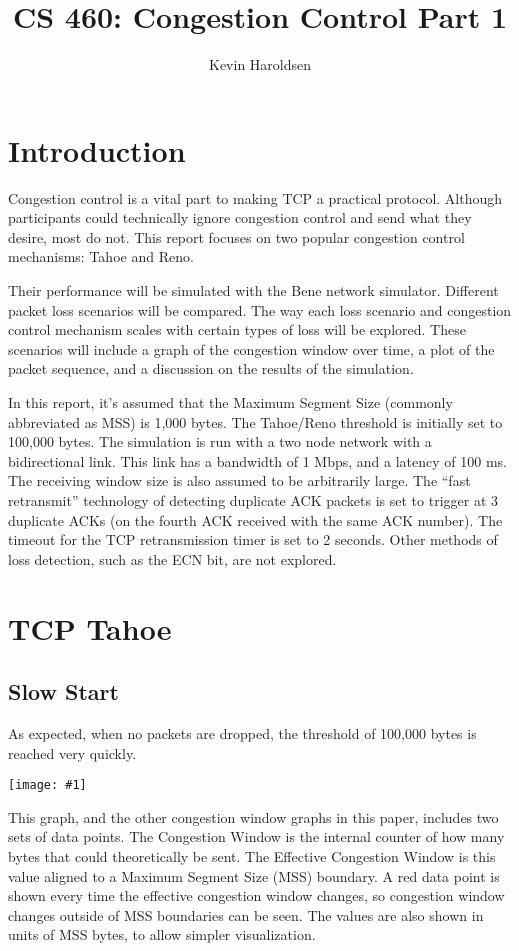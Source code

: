 \documentclass[fleqn,11pt]{article}
\title{CS 460: Congestion Control Part 1}
\author{Kevin Haroldsen}
\date{}
\newcommand{\graph}[2]{\begin{center}\texttt{[image: \#1]}\end{center}}
\newcommand{\cwnd}[1]{\graph{#1/cwnd}{height=3.5in}}
\begin{document}
\maketitle

\section{Introduction}
Congestion control is a vital part to making TCP a practical protocol.
Although participants could technically ignore congestion control and send what they desire, most do not.
This report focuses on two popular congestion control mechanisms: Tahoe and Reno.

Their performance will be simulated with the Bene network simulator.
Different packet loss scenarios will be compared.
The way each loss scenario and congestion control mechanism scales with certain types of loss will be explored.
These scenarios will include a graph of the congestion window over time, a plot of the packet sequence, and a discussion on the results of the simulation.

In this report, it's assumed that the Maximum Segment Size (commonly abbreviated as MSS) is 1,000 bytes.
The Tahoe/Reno threshold is initially set to 100,000 bytes.
The simulation is run with a two node network with a bidirectional link.
This link has a bandwidth of 1 Mbps, and a latency of 100 ms.
The receiving window size is also assumed to be arbitrarily large.
The ``fast retransmit'' technology of detecting duplicate ACK packets is set to trigger at 3 duplicate ACKs (on the fourth ACK received with the same ACK number).
The timeout for the TCP retransmission timer is set to 2 seconds.
Other methods of loss detection, such as the ECN bit, are not explored.

\section{TCP Tahoe}
\subsection{Slow Start}
As expected, when no packets are dropped, the threshold of 100,000 bytes is reached very quickly.
\cwnd{tahoe-0}

This graph, and the other congestion window graphs in this paper, includes two sets of data points.
The Congestion Window is the internal counter of how many bytes that could theoretically be sent.
The Effective Congestion Window is this value aligned to a Maximum Segment Size (MSS) boundary.
A red data point is shown every time the effective congestion window changes, so congestion window changes outside of MSS boundaries can be seen.
The values are also shown in units of MSS bytes, to allow simpler visualization.
\end{document}
